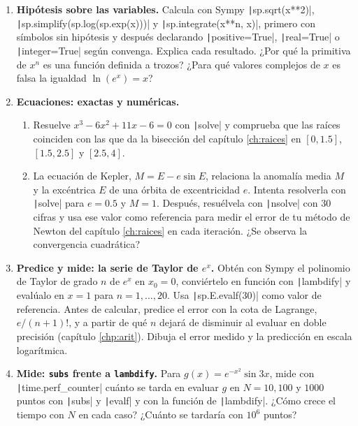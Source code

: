 \begin{enumerate}
\item \label{ej:sim_supuestos} \textbf{Hipótesis sobre las variables.} Calcula con Sympy \texttt|sp.sqrt(x**2)|, \texttt|sp.simplify(sp.log(sp.exp(x)))| y \texttt|sp.integrate(x**n, x)|, primero con símbolos sin hipótesis y después declarando \texttt|positive=True|, \texttt|real=True| o \texttt|integer=True| según convenga. Explica cada resultado. ¿Por qué la primitiva de $x^n$ es una función definida a trozos? ¿Para qué valores complejos de $x$ es falsa la igualdad $\ln(e^x)=x$?

\item \label{ej:sim_ecuaciones} \textbf{Ecuaciones: exactas y numéricas.}
\begin{enumerate}
\item Resuelve $x^3-6x^2+11x-6=0$ con \texttt|solve| y comprueba que las raíces coinciden con las que da la bisección del capítulo \ref{ch:raices} en $[0, 1.5]$, $[1.5, 2.5]$ y $[2.5, 4]$.
\item La ecuación de Kepler, $M = E - e\sin E$, relaciona la anomalía media $M$ y la excéntrica $E$ de una órbita de excentricidad $e$. Intenta resolverla con \texttt|solve| para $e=0.5$ y $M=1$. Después, resuélvela con \texttt|nsolve| con 30 cifras y usa ese valor como referencia para medir el error de tu método de Newton del capítulo \ref{ch:raices} en cada iteración. ¿Se observa la convergencia cuadrática?
\end{enumerate}

\item \label{ej:sim_serie} \textbf{Predice y mide: la serie de Taylor de $e^x$.} Obtén con Sympy el polinomio de Taylor de grado $n$ de $e^x$ en $x_0=0$, conviértelo en función con \texttt|lambdify| y evalúalo en $x=1$ para $n=1,\dots,20$. Usa \texttt|sp.E.evalf(30)| como valor de referencia. Antes de calcular, predice el error con la cota de Lagrange, $e/(n+1)!$, y a partir de qué $n$ dejará de disminuir al evaluar en doble precisión (capítulo \ref{chp:arit}). Dibuja el error medido y la predicción en escala logarítmica.

\item \label{ej:sim_lambdify} \textbf{Mide: \texttt{subs} frente a \texttt{lambdify}.} Para $g(x)=e^{-x^2}\sin 3x$, mide con \texttt|time.perf_counter| cuánto se tarda en evaluar $g$ en $N=10, 100$ y $1000$ puntos con \texttt|subs| y \texttt|evalf| y con la función de \texttt|lambdify|. ¿Cómo crece el tiempo con $N$ en cada caso? ¿Cuánto se tardaría con $10^6$ puntos?


\end{enumerate}
